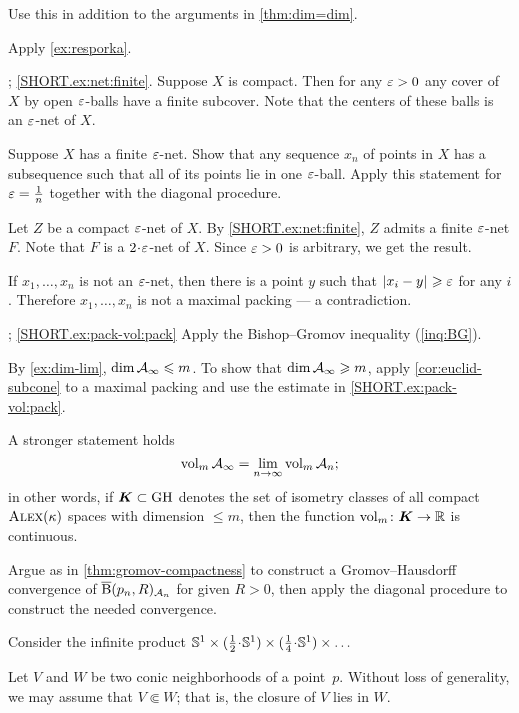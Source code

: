 Use this in addition to the arguments in \ref{thm:dim=dim}. 

Apply \ref{ex:resporka}.

\parbf{\ref{ex:net}};
\ref{SHORT.ex:net:finite}.
Suppose $X$ is compact.
Then for any $\varepsilon>0$ any cover of $X$ by open $\varepsilon$-balls have a finite subcover.
Note that the centers of these balls is an $\varepsilon$-net of $X$.

Suppose $X$ has a finite $\varepsilon$-net.
Show that any sequence $x_n$ of points in $X$ has a subsequence such that all of its points lie in one $\varepsilon$-ball.
Apply this statement for $\varepsilon=\tfrac1n$ together with the diagonal procedure.

Let $Z$ be a compact $\varepsilon$-net of $X$.
By \ref{SHORT.ex:net:finite}, $Z$ admits a finite $\varepsilon$-net $F$.
Note that $F$ is a $2\cdot\eps$-net of $X$.
Since $\varepsilon>0$ is arbitrary, we get the result.


 If $x_1,\dots,x_n$ is not an $\varepsilon$-net, then there is a point $y$ such that $|{x_i}-{y}|_{}^{{}}\geqslant\varepsilon$ for any $i$.
Therefore $x_1,\dots,x_n$ is not a maximal packing --- a contradiction.

\parbf{\ref{ex:pack-vol}}; \ref{SHORT.ex:pack-vol:pack}
Apply the Bishop--Gromov inequality (\ref{inq:BG}).

\parit{\ref{SHORT.ex:pack-vol:dim}}
By \ref{ex:dim-lim}, $\operatorname{\rm dim}\nolimits\mathcal{A}_\infty\leqslant m$.
To show that $\operatorname{\rm dim}\nolimits\mathcal{A}_\infty\geqslant m$,
apply \ref{cor:euclid-subcone} to a maximal packing and use the estimate in \ref{SHORT.ex:pack-vol:pack}.

A stronger statement holds 
\[\operatorname{\rm vol}\nolimits_m\mathcal{A}_\infty=\lim_{n\to\infty} \operatorname{\rm vol}\nolimits_m\mathcal{A}_n;\]
in other words, if $\bm{K}\subset \operatorname{\rm GH}\nolimits$ denotes the set of isometry classes of all compact $\textsc{Alex}(\kappa)$ spaces with dimension $\le m$, then the function
$\operatorname{\rm vol}\nolimits_m\colon\bm{K}\to \mathbb{R}$ is continuous.


Argue as in \ref{thm:gromov-compactness} to construct a Gromov--Hausdorff convergence of $\overline{\mathrm{B}}{}(p_n,R)_{\mathcal{A}_n}$ for given $R>0$, then apply the diagonal procedure to construct the needed convergence.

Consider the infinite product $\SSS^1\times ({\tfrac 12}\cdot \SSS^1)\times ({\tfrac 14}\cdot \SSS^1)\times\dots$

Let $V$ and $W$ be two conic neighborhoods of a point~$p$.
Without loss of generality, we may assume that $V\Subset W$;
that is, the closure of $V$ lies in $W$.

